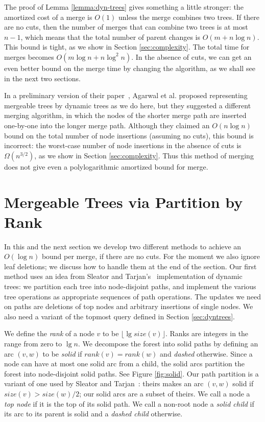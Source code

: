 \documentclass[twoside,leqno,twocolumn]{article}
\newcommand{\rank}{\mathit{rank}}
\newcommand{\size}{\mathit{size}}
\begin{document}
The proof of Lemma \ref{lemma:dyn-trees} gives something a little stronger: the amortized cost of a merge is $O(1)$ unless the merge combines two trees.  If there are no cuts, then the number of merges that can combine two trees is at most $n - 1$,
which means that the total number of parent changes is $O(m + n \log n)$. This bound is tight, as we show in Section \ref{sec:complexity}.  The total time for merges becomes $O(m \log n + n \log^2 n)$.  In the absence of cuts, we can get an even better bound on the merge time by changing the algorithm, as we shall see in the next two sections.

In a preliminary version of their paper~\cite{AEHW04}, Agarwal et al. proposed representing mergeable trees by dynamic trees as we do here, but they suggested a different merging algorithm, in which the nodes of the shorter merge path are inserted one-by-one into the longer merge path.  Although they claimed an $O(n \log n)$ bound on the total number of node insertions (assuming no cuts), this bound is incorrect: the worst-case number of node insertions in the absence of cuts is $\Omega(n^{3/2})$, as we show in Section \ref{sec:complexity}.  Thus this method of merging does not give even a polylogarithmic amortized bound for merge.




\section{Mergeable Trees via Partition by Rank}
\label{sec:part-rank}


In this and the next section we develop two different methods to achieve an $O(\log n)$ bound per merge, if there are no cuts.  For the moment we also ignore leaf deletions; we discuss how to handle them at the end of the section.  Our first method uses an idea from Sleator and Tarjan's~\cite{ST83, ST85} implementation of dynamic trees: we partition each tree into node-disjoint paths, and implement the various tree operations as appropriate sequences of path operations.  The updates we need on paths are deletions of top nodes and arbitrary insertions of single nodes.  We also need a variant of the topmost query defined in Section \ref{sec:dyntrees}.

We define the \emph{rank} of a node $v$ to be $\lfloor \lg \size(v)\rfloor$.  Ranks are integers in the range from zero to $\lg n$.  We
decompose the forest into solid paths by defining an arc $(v, w)$ to be \emph{solid} if $\rank(v) = \rank(w)$ and \emph{dashed} otherwise. Since a node can have at most one solid arc from a child, the solid arcs partition the forest into node-disjoint solid paths. See Figure \ref{fig:solid}.  Our path partition is a variant of one used by Sleator and Tarjan~\cite{ST83}: theirs makes an arc $(v, w)$ solid if $\size(v) > \size(w)/2$;  our solid arcs are a subset of theirs. We call a node a \emph{top node} if it is the top of its solid path. We call a non-root node a \emph{solid child} if its arc to its parent is solid and a \emph{dashed child} otherwise.
\end{document}

